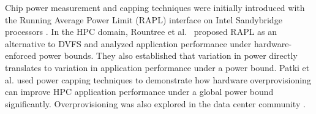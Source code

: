 Chip power measurement and capping techniques were initially introduced with the Running Average Power Limit (RAPL) interface on Intel Sandybridge processors \cite{IntelSDM,David2010}. In the HPC domain, Rountree et al.~\cite{Rountree2012} proposed RAPL as an alternative to DVFS and analyzed application performance under hardware-enforced power bounds. They also established that variation in power directly translates to variation in application performance under a power bound. Patki et al. \cite{Patki1} used power capping techniques to demonstrate how hardware overprovisioning can improve HPC application performance under a global power bound significantly. Overprovisioning was also explored in the data center community \cite{femal:04}.

%
%
%
%
%
%

